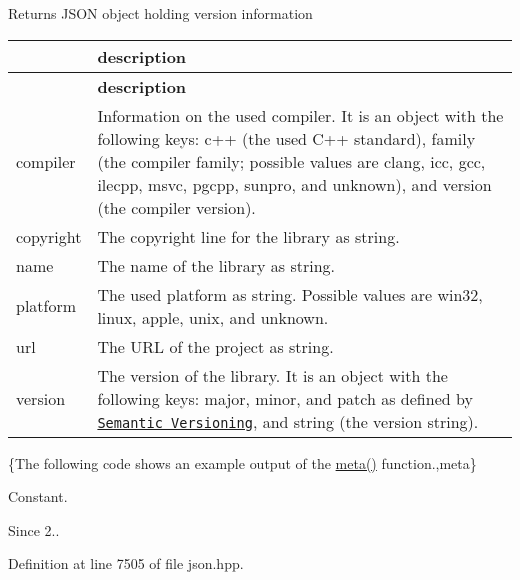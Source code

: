 \begin{DoxyReturn}{Returns}
J\+S\+ON object holding version information \tabulinesep=1mm
\begin{longtabu} spread 0pt [c]{*2{|X[-1]}|}
\hline
{}&{\bf description  }\\
\endfirsthead
\hline
\endfoot
\hline
{}&{\bf description  }\\
\endhead
{\ttfamily compiler} &Information on the used compiler. It is an object with the following keys\+: {\ttfamily c++} (the used C++ standard), {\ttfamily family} (the compiler family; possible values are {\ttfamily clang}, {\ttfamily icc}, {\ttfamily gcc}, {\ttfamily ilecpp}, {\ttfamily msvc}, {\ttfamily pgcpp}, {\ttfamily sunpro}, and {\ttfamily unknown}), and {\ttfamily version} (the compiler version). \\
{\ttfamily copyright} &The copyright line for the library as string. \\
{\ttfamily name} &The name of the library as string. \\
{\ttfamily platform} &The used platform as string. Possible values are {\ttfamily win32}, {\ttfamily linux}, {\ttfamily apple}, {\ttfamily unix}, and {\ttfamily unknown}. \\
{\ttfamily url} &The U\+RL of the project as string. \\
{\ttfamily version} &The version of the library. It is an object with the following keys\+: {\ttfamily major}, {\ttfamily minor}, and {\ttfamily patch} as defined by \href{http://semver.org}{\tt Semantic Versioning}, and {\ttfamily string} (the version string). \\
\end{longtabu}
\{The following code shows an example output of the {\ttfamily \hyperlink{classnlohmann_1_1basic__json_aef6d0eeccee7c5c7e1317c2ea1607fab}{meta()}} function.,meta\}
\end{DoxyReturn}
Constant.

\begin{DoxySince}{Since}
2.. 
\end{DoxySince}


Definition at line 7505 of file json.\+hpp.

